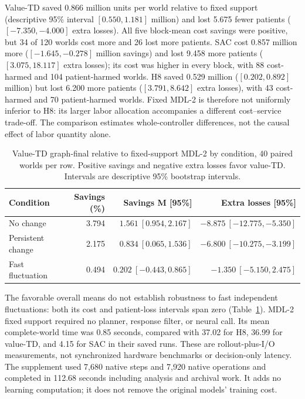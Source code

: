 \documentclass[preprint,review,12pt]{elsarticle}
\begin{document}
Value-TD saved 0.866 million units per world relative to fixed support
(descriptive 95\% interval $[0.550,1.181]$ million) and lost 5.675 fewer
patients ($[-7.350,-4.000]$ extra losses). All five block-mean cost savings
were positive, but 34 of 120 worlds cost more and 26 lost more patients.
SAC cost 0.857 million more ($[-1.645,-0.278]$ million savings) and lost
9.458 more patients ($[3.075,18.117]$ extra losses); its cost was higher
in every block, with 88 cost-harmed and 104 patient-harmed worlds.
H8 saved 0.529 million ($[0.202,0.892]$ million) but lost 6.200 more
patients ($[3.791,8.642]$ extra losses), with 43 cost-harmed and 70
patient-harmed worlds. Fixed MDL-2 is therefore not uniformly inferior to
H8: its larger labor allocation accompanies a different cost--service
trade-off. The comparison estimates whole-controller differences, not the
causal effect of labor quantity alone.

\begin{table}[tbp]
\centering
\caption{Value-TD graph-final relative to fixed-support MDL-2 by condition,
40 paired worlds per row. Positive savings and negative extra losses favor
value-TD. Intervals are descriptive 95\% bootstrap intervals.}
\label{tab:mdl2-fixed-conditions}
\small
\setlength{\tabcolsep}{3pt}
\begin{tabularx}{\textwidth}{Xrrr}
\toprule
Condition & Savings (\%) & Savings M [95\%] & Extra losses [95\%] \\
\midrule
No change & 3.794 & $1.561\ [0.954,2.167]$ & $-8.875\ [-12.775,-5.350]$ \\
Persistent change & 2.175 & $0.834\ [0.065,1.536]$ & $-6.800\ [-10.275,-3.199]$ \\
Fast fluctuation & 0.494 & $0.202\ [-0.443,0.865]$ & $-1.350\ [-5.150,2.475]$ \\
\bottomrule
\end{tabularx}
\end{table}

The favorable overall means do not establish robustness to fast independent
fluctuations: both its cost and patient-loss intervals span zero
(Table~\ref{tab:mdl2-fixed-conditions}). MDL-2 fixed support required no
planner, response filter, or neural call. Its mean complete-world time was
0.85 seconds, compared with 37.02 for H8, 36.99 for value-TD, and 4.15 for
SAC in their saved runs. These are rollout-plus-I/O measurements, not
synchronized hardware benchmarks or decision-only latency. The supplement
used 7,680 native steps and 7,920 native operations and completed in
112.68 seconds including analysis and archival work. It adds no learning
computation; it does not remove the original models' training cost.
\end{document}
